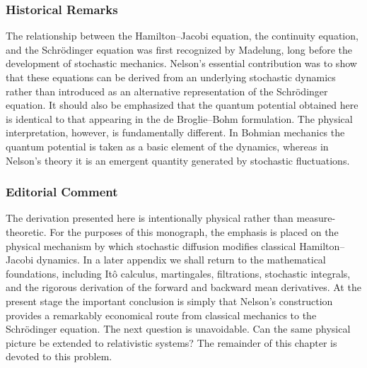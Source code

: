 \subsubsection*{Historical Remarks}
The relationship between the Hamilton--Jacobi equation, the continuity
equation, and the Schrödinger equation was first recognized by
Madelung, long before the development of stochastic mechanics.
Nelson's essential contribution was to show that these equations can be
derived from an underlying stochastic dynamics rather than introduced as
an alternative representation of the Schrödinger equation.
It should also be emphasized that the quantum potential obtained here is
identical to that appearing in the de Broglie--Bohm formulation.
The physical interpretation, however, is fundamentally different.
In Bohmian mechanics the quantum potential is taken as a basic element
of the dynamics, whereas in Nelson's theory it is an emergent quantity
generated by stochastic fluctuations.
\subsubsection*{Editorial Comment}
The derivation presented here is intentionally physical rather than
measure-theoretic.
For the purposes of this monograph, the emphasis is placed on the
physical mechanism by which stochastic diffusion modifies classical
Hamilton--Jacobi dynamics.
In a later appendix we shall return to the mathematical foundations,
including It\^o calculus, martingales, filtrations, stochastic
integrals, and the rigorous derivation of the forward and backward mean
derivatives.
At the present stage the important conclusion is simply that Nelson's
construction provides a remarkably economical route from classical
mechanics to the Schrödinger equation.
The next question is unavoidable.
Can the same physical picture be extended to relativistic systems?
The remainder of this chapter is devoted to this problem.
